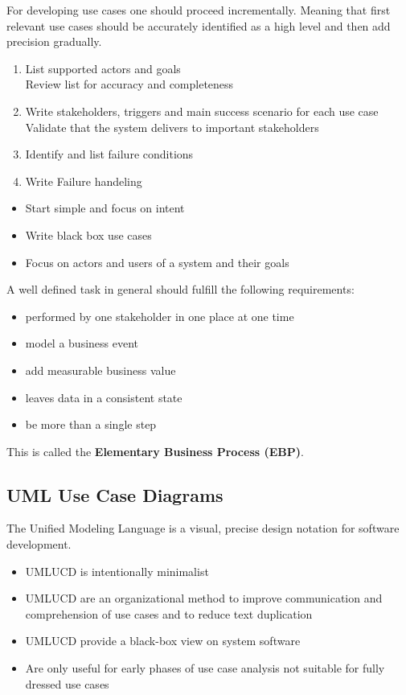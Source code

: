 \documentclass[
../../Software_Engineering_Summary.tex,
]
{subfiles}
\begin{document}
For developing use cases one should proceed incrementally. Meaning that first relevant use cases should be accurately identified as a high level and then add precision gradually.

\begin{defbox}
    \begin{enumerate}
        \item List supported actors and goals\\ Review list for accuracy and completeness
        \item Write stakeholders, triggers and main success scenario for each use case \\ Validate that the system delivers to important stakeholders
        \item Identify and list failure conditions
        \item Write Failure handeling
    \end{enumerate}
    \begin{itemize}
        \item Start simple and focus on intent
        \item Write black box use cases
        \item Focus on actors and users of a system and their goals
    \end{itemize}
\end{defbox}

A well defined task in general should fulfill the following requirements:
\begin{itemize}
    \item performed by one stakeholder in one place at one time
    \item model a business event
    \item add measurable business value
    \item leaves data in a consistent state
    \item be more than a single step
\end{itemize}
This is called the \textbf{Elementary Business Process (EBP)}.

\newpage
\subsection{UML Use Case Diagrams}
The Unified Modeling Language is a visual, precise design notation for software development.

\begin{defbox}
    \begin{itemize}
        \item UMLUCD is intentionally minimalist
        \item UMLUCD are an organizational method to improve communication and comprehension of use cases and to reduce text duplication
        \item UMLUCD provide a black-box view on system software
        \item Are only useful for early phases of use case analysis \rightarrow not suitable for fully dressed use cases
    \end{itemize}
\end{defbox}
\end{document}

